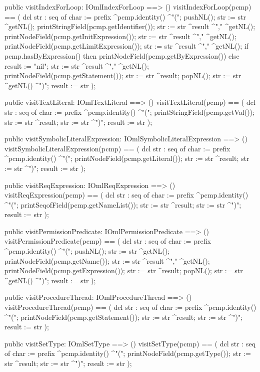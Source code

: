 \begin{vdm_al}
  public visitIndexForLoop: IOmlIndexForLoop ==> ()
  visitIndexForLoop(pcmp) ==
    ( dcl str : seq of char := prefix ^pcmp.identity() ^"(";
      pushNL();
      str := str ^getNL();
      printStringField(pcmp.getIdentifier());
      str := str ^result ^"," ^getNL();
      printNodeField(pcmp.getInitExpression());
      str := str ^result ^"," ^getNL();
      printNodeField(pcmp.getLimitExpression());
      str := str ^result ^"," ^getNL();
      if pcmp.hasByExpression()
      then printNodeField(pcmp.getByExpression())
      else result := "nil";
      str := str ^result ^"," ^getNL();
      printNodeField(pcmp.getStatement());
      str := str ^result;
      popNL();
      str := str ^getNL() ^")";
      result := str );

  public visitTextLiteral: IOmlTextLiteral ==> ()
  visitTextLiteral(pcmp) ==
    ( dcl str : seq of char := prefix ^pcmp.identity() ^"(";
      printStringField(pcmp.getVal());
      str := str ^result;
      str := str ^")";
      result := str );

  public visitSymbolicLiteralExpression: IOmlSymbolicLiteralExpression ==> ()
  visitSymbolicLiteralExpression(pcmp) ==
    ( dcl str : seq of char := prefix ^pcmp.identity() ^"(";
      printNodeField(pcmp.getLiteral());
      str := str ^result;
      str := str ^")";
      result := str );

  public visitReqExpression: IOmlReqExpression ==> ()
  visitReqExpression(pcmp) ==
    ( dcl str : seq of char := prefix ^pcmp.identity() ^"(";
      printSeqofField(pcmp.getNameList());
      str := str ^result;
      str := str ^")";
      result := str );

  public visitPermissionPredicate: IOmlPermissionPredicate ==> ()
  visitPermissionPredicate(pcmp) ==
    ( dcl str : seq of char := prefix ^pcmp.identity() ^"(";
      pushNL();
      str := str ^getNL();
      printNodeField(pcmp.getName());
      str := str ^result ^"," ^getNL();
      printNodeField(pcmp.getExpression());
      str := str ^result;
      popNL();
      str := str ^getNL() ^")";
      result := str );

  public visitProcedureThread: IOmlProcedureThread ==> ()
  visitProcedureThread(pcmp) ==
    ( dcl str : seq of char := prefix ^pcmp.identity() ^"(";
      printNodeField(pcmp.getStatement());
      str := str ^result;
      str := str ^")";
      result := str );

  public visitSetType: IOmlSetType ==> ()
  visitSetType(pcmp) ==
    ( dcl str : seq of char := prefix ^pcmp.identity() ^"(";
      printNodeField(pcmp.getType());
      str := str ^result;
      str := str ^")";
      result := str );


\end{vdm_al}
